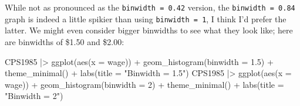\documentclass[
  letterpaper,
]{book}
\newenvironment{Shaded}{\begin{snugshade}}{\end{snugshade}}
\newcommand{\AttributeTok}[1]{\textcolor[rgb]{0.40,0.45,0.13}{#1}}
\newcommand{\DecValTok}[1]{\textcolor[rgb]{0.68,0.00,0.00}{#1}}
\newcommand{\FloatTok}[1]{\textcolor[rgb]{0.68,0.00,0.00}{#1}}
\newcommand{\FunctionTok}[1]{\textcolor[rgb]{0.28,0.35,0.67}{#1}}
\newcommand{\NormalTok}[1]{\textcolor[rgb]{0.00,0.23,0.31}{#1}}
\newcommand{\SpecialCharTok}[1]{\textcolor[rgb]{0.37,0.37,0.37}{#1}}
\newcommand{\StringTok}[1]{\textcolor[rgb]{0.13,0.47,0.30}{#1}}
\begin{document}
While not as pronounced as the \texttt{binwidth\ =\ 0.42} version, the
\texttt{binwidth\ =\ 0.84} graph is indeed a little spikier than using
\texttt{binwidth\ =\ 1}, I think I'd prefer the latter. We might even
consider bigger binwidths to see what they look like; here are binwidths
of \$1.50 and \$2.00:

\begin{Shaded}
\begin{Highlighting}[]
\NormalTok{CPS1985 }\SpecialCharTok{|\textgreater{}} \FunctionTok{ggplot}\NormalTok{(}\FunctionTok{aes}\NormalTok{(}\AttributeTok{x =}\NormalTok{ wage)) }\SpecialCharTok{+}
    \FunctionTok{geom\_histogram}\NormalTok{(}\AttributeTok{binwidth =} \FloatTok{1.5}\NormalTok{) }\SpecialCharTok{+}
    \FunctionTok{theme\_minimal}\NormalTok{() }\SpecialCharTok{+}
    \FunctionTok{labs}\NormalTok{(}\AttributeTok{title =} \StringTok{"Binwidth = 1.5"}\NormalTok{)}
\NormalTok{CPS1985 }\SpecialCharTok{|\textgreater{}} \FunctionTok{ggplot}\NormalTok{(}\FunctionTok{aes}\NormalTok{(}\AttributeTok{x =}\NormalTok{ wage)) }\SpecialCharTok{+}
    \FunctionTok{geom\_histogram}\NormalTok{(}\AttributeTok{binwidth =} \DecValTok{2}\NormalTok{) }\SpecialCharTok{+}
    \FunctionTok{theme\_minimal}\NormalTok{() }\SpecialCharTok{+}
    \FunctionTok{labs}\NormalTok{(}\AttributeTok{title =} \StringTok{"Binwidth = 2"}\NormalTok{)}
\end{Highlighting}
\end{Shaded}
\end{document}
